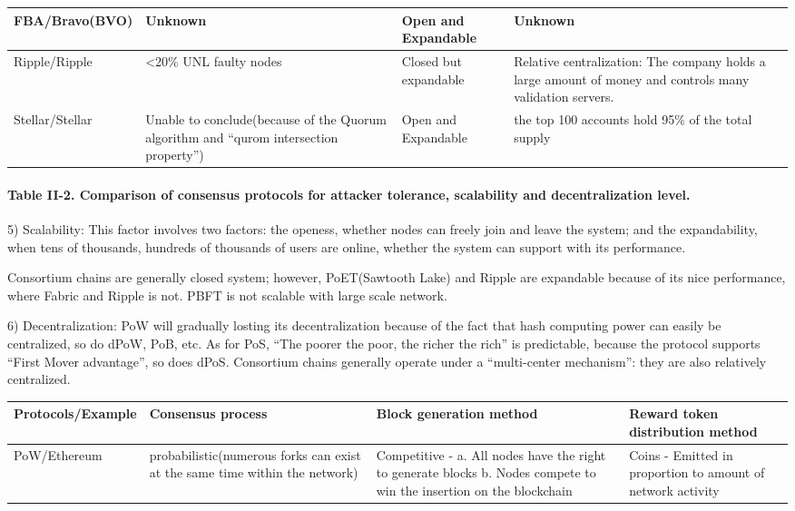 \documentclass[doublespacing]{bmcart}
\begin{document}
\begin{CJK*}{UTF8}{gbsn}
\begin{tabular}{p{2cm}p{3cm}p{3cm}p{3cm}}
FBA/Bravo\newline(BVO) 
& Unknown 
& Open and Expandable 
& Unknown  \\ \hline

Ripple/Ripple 
& \textless20\% UNL faulty nodes 
& Closed but expandable
& Relative centralization: The company holds a large amount of money and controls many validation servers.\\ \hline

Stellar/Stellar 
& Unable to conclude(because of the Quorum algorithm and ``qurom intersection property'') 
& Open and Expandable 
& the top 100 accounts hold 95\% of the total supply \\ \hline
\end{tabular}
\paragraph{Table II-2. Comparison of consensus protocols for attacker tolerance, scalability and decentralization level.}


5) Scalability: This factor involves two factors: the openess, whether nodes can freely join and leave the system; and the expandability, when tens of thousands, hundreds of thousands of users are online, whether the system can support with its performance.

Consortium chains are generally closed system; however, PoET(Sawtooth Lake) and Ripple are expandable because of its nice performance, where Fabric and Ripple is not. PBFT is not scalable with large scale network.

6) Decentralization: PoW will gradually losting its decentralization because of the fact that hash computing power can easily be centralized, so do dPoW, PoB, etc. As for PoS, ``The poorer the poor, the richer the rich'' is predictable, because the protocol supports ``First Mover advantage'', so does dPoS. Consortium chains generally operate under a ``multi-center mechanism'': they are also relatively centralized.

\begin{tabular}{p{2cm}p{3cm}p{3cm}p{3cm}}
\hline
Protocols/E\-xample  & Consensus process & Block generation method & Reward token distribution method \\ \hline

PoW/Ethe\-reum  
& probabilistic(nume\-rous forks can exist at the same time within the network) 
& Competitive - \newline a. All nodes have the right to generate blocks \newline b. Nodes compete to win the insertion on the blockchain 
& Coins - Emitted in proportion to amount of network activity \\ \hline


\end{tabular}
\end{CJK*}
\end{document}
